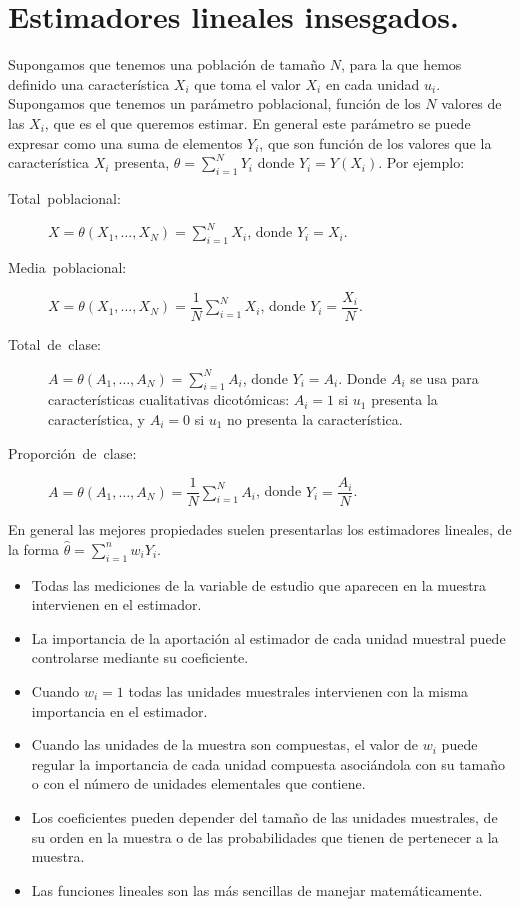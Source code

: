 \section{Estimadores lineales insesgados.}

Supongamos que tenemos una poblaci\'on de tama\~no $N$, para la que hemos
definido una caracter\'istica $X_{i}$ que toma el valor $X_{i}$ en
cada unidad $u_{i}$. Supongamos que tenemos un par\'ametro poblacional,
funci\'on de los $N$ valores de las $X_{i}$, que es el que queremos
estimar. En general este par\'ametro se puede expresar como una suma
de elementos $Y_{i}$, que son funci\'on de los valores que la caracter\'istica
$X_{i}$ presenta, $\theta=\sum_{i=1}^{N}Y_{i}$ donde $Y_{i}=Y\left(X_{i}\right)$.
Por ejemplo:
\begin{description}
\item [{Total~poblacional:}] $X=\theta\left(X_{1},\ldots,X_{N}\right)=\sum_{i=1}^{N}X_{i}$,
donde $Y_{i}=X_{i}$.
\item [{Media~poblacional:}] $X=\theta\left(X_{1},\ldots,X_{N}\right)=\dfrac{1}{N}\sum_{i=1}^{N}X_{i}$,
donde $Y_{i}=\dfrac{X_{i}}{N}$.
\item [{Total~de~clase:}] $A=\theta\left(A_{1},\ldots,A_{N}\right)=\sum_{i=1}^{N}A_{i}$,
donde $Y_{i}=A_{i}$. Donde $A_{i}$ se usa para caracter\'isticas cualitativas
dicot\'omicas: $A_{i}=1$ si $u_{1}$ presenta la caracter\'istica, y
$A_{i}=0$ si $u_{1}$ no presenta la caracter\'istica.
\item [{Proporci\'on~de~clase:}] $A=\theta\left(A_{1},\ldots,A_{N}\right)=\dfrac{1}{N}\sum_{i=1}^{N}A_{i}$,
donde $Y_{i}=\dfrac{A_{i}}{N}$.
\end{description}
En general las mejores propiedades suelen presentarlas los estimadores
lineales, de la forma $\hat{\theta}=\sum_{i=1}^{n}w_{i}Y_{i}$.
\begin{itemize}
\item Todas las mediciones de la variable de estudio que aparecen en la
muestra intervienen en el estimador.
\item La importancia de la aportaci\'on al estimador de cada unidad muestral
puede controlarse mediante su coeficiente.
\item Cuando $w_{i}=1$ todas las unidades muestrales intervienen con la
misma importancia en el estimador.
\item Cuando las unidades de la muestra son compuestas, el valor de $w_{i}$
puede regular la importancia de cada unidad compuesta asoci\'andola
con su tama\~no o con el n\'umero de unidades elementales que contiene.
\item Los coeficientes pueden depender del tama\~no de las unidades muestrales,
de su orden en la muestra o de las probabilidades que tienen de pertenecer
a la muestra.
\item Las funciones lineales son las m\'as sencillas de manejar matem\'aticamente.
\end{itemize}

